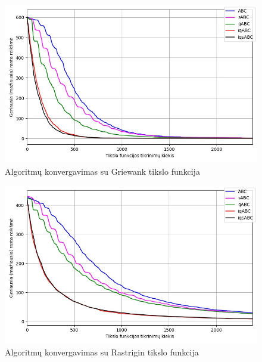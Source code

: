 \documentclass{VUMIFPSmagistrinis}
\begin{document}
\begin{landscape}
\begin{multicols}{2}
\begin{figure}[H]
    \centering
    \includegraphics[scale=0.45]{img/2kv/all_griewank.jpg}
     \caption{Algoritmų konvergavimas su Griewank tikslo funkcija}
    \label{img:kon5a}
\end{figure}

\begin{figure}[H]
    \centering
    \includegraphics[scale=0.45]{img/2kv/all_rastrigin.jpg}
     \caption{Algoritmų konvergavimas su Rastrigin tikslo funkcija}
    \label{img:kon5}
\end{figure}



\end{multicols}
\begin{multicols}{2}


\end{multicols}
\end{landscape}
\end{document}

